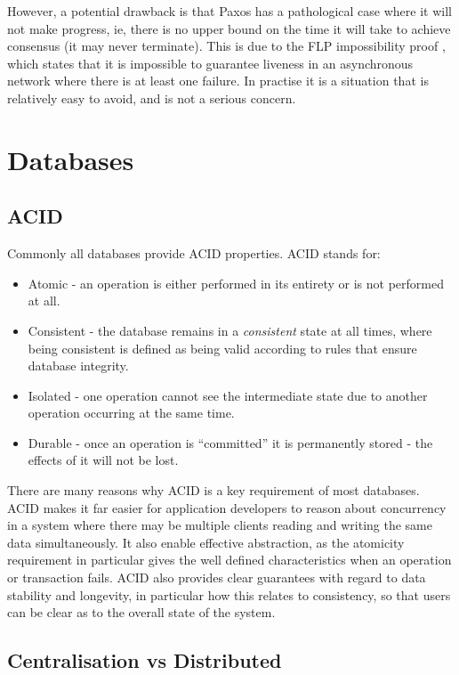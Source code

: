 \documentclass[12pt,twoside,notitlepage]{report}
\begin{document}
However, a potential drawback is that Paxos has a pathological case where it will not make
progress, ie, there is no upper bound on the time it will take to achieve consensus (it may never
terminate). This is due to the FLP impossibility proof \cite{fischer85}, which states that it is
impossible to guarantee liveness in an asynchronous network where there is at least one failure.
In practise it is a situation that is relatively easy to avoid, and is not a serious concern.

\section{Databases}

\subsection*{ACID}

Commonly all databases provide ACID properties. ACID stands for:

\begin{itemize}
\item Atomic - an operation is either performed in its entirety or is not performed at all.
\item Consistent - the database remains in a \emph{consistent} state at all times, where being
	consistent is defined as being valid according to rules that ensure database integrity.
\item Isolated - one operation cannot see the intermediate state due to another operation occurring
	at the same time.
\item Durable - once an operation is ``committed'' it is permanently stored - the effects of it will
	not be lost.
\end{itemize}

There are many reasons why ACID is a key requirement of most databases. ACID makes it far easier
for application developers to reason about concurrency in a system where there may be multiple
clients reading and writing the same data simultaneously. It also enable effective abstraction, as
the atomicity requirement in particular gives the well defined characteristics when an operation
or transaction fails. ACID also provides clear guarantees with regard to data stability and
longevity, in particular how this relates to consistency, so that users can be clear as to the
overall state of the system.

\subsection*{Centralisation vs Distributed}
\end{document}
